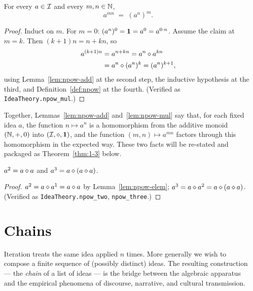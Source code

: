 \begin{lemma}\label{lem:npow-mul}
For every $a \in \mathcal{I}$ and every $m, n \in \mathbb{N}$,
\begin{equation}\label{eq:npow-mul}
a^{mn} \;=\; (a^n)^m.
\end{equation}
\end{lemma}

\begin{proof}
Induct on $m$.  For $m = 0$: $(a^n)^0 = \mathbf{1} = a^0 = a^{0\cdot n}$.  Assume
the claim at $m = k$.  Then $(k+1)n = n + kn$, so
\begin{align*}
a^{(k+1)n}
&= a^{n + kn}
= a^n \mathbin{\diamond} a^{kn} \\
&= a^n \mathbin{\diamond} (a^n)^k
= (a^n)^{k+1},
\end{align*}
using Lemma~\ref{lem:npow-add} at the second step, the inductive
hypothesis at the third, and Definition~\ref{def:npow} at the fourth.
(Verified as \texttt{IdeaTheory.npow\_mul}.)
\end{proof}

Together, Lemmas~\ref{lem:npow-add} and~\ref{lem:npow-mul} say that, for
each fixed idea $a$, the function $n \mapsto a^n$ is a homomorphism from
the additive monoid $(\mathbb{N}, +, 0)$ into $(\mathcal{I},\mathbin{\diamond},\mathbf{1})$, and the function
$(m,n) \mapsto a^{mn}$ factors through this homomorphism in the
expected way.  These two facts will be re-stated and packaged as
Theorem~\ref{thm:1-3} below.

\begin{lemma}\label{lem:npow-small}
$a^2 = a \mathbin{\diamond} a$ and $a^3 = a \mathbin{\diamond} (a \mathbin{\diamond} a)$.
\end{lemma}

\begin{proof}
$a^2 = a \mathbin{\diamond} a^1 = a \mathbin{\diamond} a$ by Lemma~\ref{lem:npow-elem};
$a^3 = a \mathbin{\diamond} a^2 = a \mathbin{\diamond} (a \mathbin{\diamond} a)$.  (Verified as
\texttt{IdeaTheory.npow\_two}, \texttt{npow\_three}.)
\end{proof}

\section{Chains}\label{sec:chains}

Iteration treats the same idea applied $n$ times.  More generally we wish
to compose a finite sequence of (possibly distinct) ideas.  The resulting
construction --- the \emph{chain} of a list of ideas --- is the bridge
between the algebraic apparatus and the empirical phenomena of discourse,
narrative, and cultural transmission.

